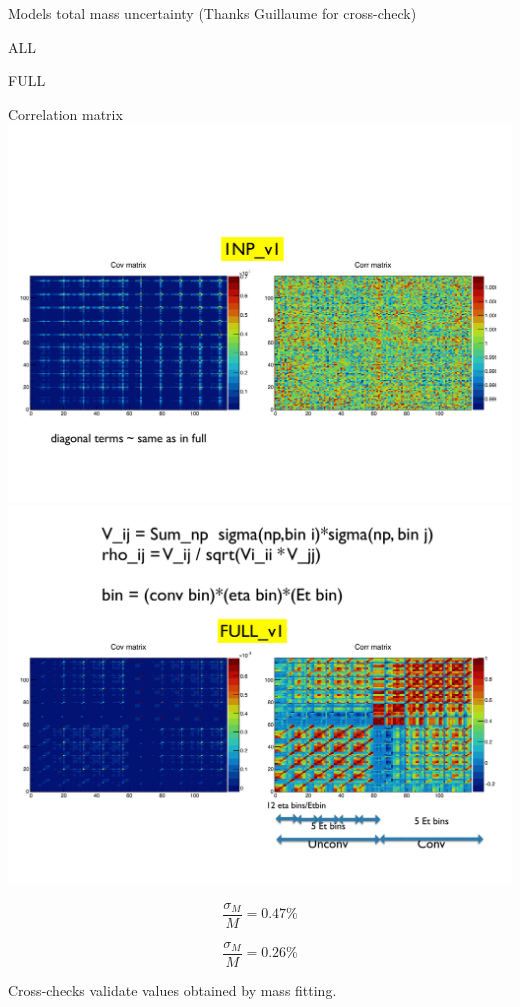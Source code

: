\documentclass[a4paper]{beamer}
\begin{document}
\begin{frame}{Models total mass uncertainty}
  (Thanks Guillaume for cross-check)
  
  \centering
  \begin{minipage}{0.49\linewidth}\centering ALL \end{minipage}
  \hfill
  \begin{minipage}{0.49\linewidth}\centering FULL \end{minipage}

  Correlation matrix\\
  \includegraphics[width=0.49\linewidth]{plots/170109_Unal_mh_syst_corrALL.pdf}
  \hfill
  \includegraphics[width=0.49\linewidth]{plots/170109_Unal_mh_syst_corrFULL.pdf}

  
  \begin{minipage}{0.49\linewidth} $$\frac{\sigma_M}{M}=0.47\%$$\end{minipage}
  \hfill
  \begin{minipage}{0.49\linewidth}$$\frac{\sigma_M}{M}=0.26\%$$ \end{minipage}

  \vfill
  Cross-checks validate values obtained by mass fitting.
  \end{frame}
\end{document}
